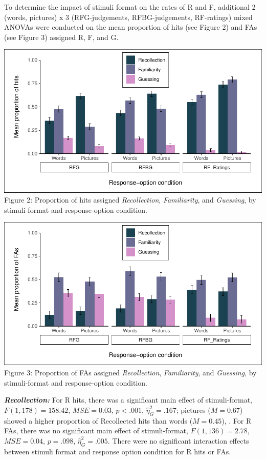 \documentclass[
  11pt,
]{article}
\begin{document}
To determine the impact of stimuli format on the rates of R and F,
additional 2 (words, pictures) x 3 (RFG-judgements, RFBG-judgements,
RF-ratings) mixed ANOVAs were conducted on the mean proportion of hits
(see Figure 2) and FAs (see Figure 3) assigned R, F, and G.

\newpage

\includegraphics{R--Thesis_files/figure-latex/unnamed-chunk-12-1.pdf}
Figure 2: Proportion of hits assigned \emph{Recollection},
\emph{Familiarity}, and \emph{Guessing}, by stimuli-format and
response-option condition.

\includegraphics{R--Thesis_files/figure-latex/unnamed-chunk-14-1.pdf}
Figure 3: Proportion of FAs assigned \emph{Recollection},
\emph{Familiarity}, and \emph{Guessing}, by stimuli-format and
response-option condition. \newpage

\textbf{\emph{Recollection:}} For R hits, there was a significant main
effect of stimuli-format, \(F(1, 178) = 158.42\),
\(\mathit{MSE} = 0.03\), \(p < .001\), \(\hat{\eta}^2_G = .167\);
pictures (\(M = 0.67\)) showed a higher proportion of Recollected hits
than words (\(M = 0.45\)), . For R FAs, there was no significant main
effect of stimuli-format, \(F(1, 136) = 2.78\), \(\mathit{MSE} = 0.04\),
\(p = .098\), \(\hat{\eta}^2_G = .005\). There were no significant
interaction effects between stimuli format and response option condition
for R hits or FAs.
\end{document}
